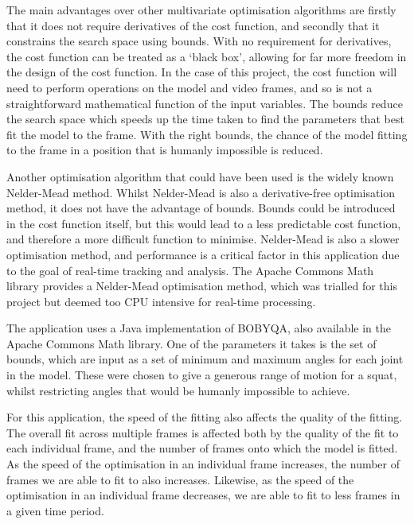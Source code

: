 The main advantages over other multivariate optimisation algorithms are firstly that it does not require derivatives of the cost function, and secondly that it constrains the search space using bounds. With no requirement for derivatives, the cost function can be treated as a `black box', allowing for far more freedom in the design of the cost function. In the case of this project, the cost function will need to perform operations on the model and video frames, and so is not a straightforward mathematical function of the input variables. The bounds reduce the search space which speeds up the time taken to find the parameters that best fit the model to the frame. With the right bounds, the chance of the model fitting to the frame in a position that is humanly impossible is reduced.

Another optimisation algorithm that could have been used is the widely known Nelder-Mead method\cite{neldermead}. Whilst Nelder-Mead is also a derivative-free optimisation method, it does not have the advantage of bounds. Bounds could be introduced in the cost function itself, but this would lead to a less predictable cost function, and therefore a more difficult function to minimise. Nelder-Mead is also a slower optimisation method, and performance is a critical factor in this application due to the goal of real-time tracking and analysis. The Apache Commons Math library\cite{apachemath} provides a Nelder-Mead optimisation method, which was trialled for this project but deemed too CPU intensive for real-time processing.

The application uses a Java implementation of BOBYQA, also available in the Apache Commons Math library\cite{apachemath}. One of the parameters it takes is the set of bounds, which are input as a set of minimum and maximum angles for each joint in the model. These were chosen to give a generous range of motion for a squat, whilst restricting angles that would be humanly impossible to achieve.

For this application, the speed of the fitting also affects the quality of the fitting. The overall fit across multiple frames is affected both by the quality of the fit to each individual frame, and the number of frames onto which the model is fitted. As the speed of the optimisation in an individual frame increases, the number of frames we are able to fit to also increases. Likewise, as the speed of the optimisation in an individual frame decreases, we are able to fit to less frames in a given time period.

